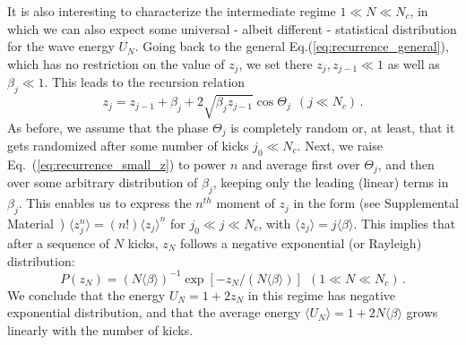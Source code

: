 \documentclass[ prl, twocolumn, superscriptaddress, amsfonts, amsmath,floatfix]{revtex4-1}
\begin{document}
It is also interesting to characterize the intermediate regime $1 \ll N \ll N_c$, in which we can also expect some universal - albeit different - statistical distribution for the wave energy $U_N$. Going back to the general Eq.(\ref{eq:recurrence_general}), which has no restriction on the value of $z_j$, we set there $z_j, z_{j-1} \ll 1$ as well as $\beta_j \ll 1$. This leads to the recursion relation
\begin{equation}
z_j = z_{j-1} + \beta_j + 2 \sqrt{\beta_j z_{j-1}} \cos \Theta_j \ \ (j \ll N_c) \, .
\label{eq:recurrence_small_z}
\end{equation}
As before, we assume that the phase $\Theta_j$ is completely random or, at least, that it gets randomized after some number of kicks $j_0 \ll N_c$. Next, we raise Eq.~(\ref{eq:recurrence_small_z}) to power $n$ and average first over $\Theta_j$, and then over some arbitrary distribution of $\beta_j$, keeping only the leading (linear) terms in $\beta_j$. {This enables us to express the $n^{th}$ moment of $z_j$ in the form (see Supplemental Material~\cite{SM})}
$\langle z_j^n \rangle = (n!) \langle z_j \rangle^n$ for $j_0 \ll j \ll N_c$,
with $\langle z_j \rangle = j \langle \beta \rangle$. This implies that after a sequence of $N$ kicks, $z_N$ follows a negative exponential (or Rayleigh) distribution:
\begin{equation}
P(z_N) = (N \langle \beta \rangle)^{-1} \exp[-z_N/(N \langle \beta \rangle)] \ \ (1 \ll N \ll N_c) \, .
\label{eq:negative_exp}
\end{equation}
We conclude that the energy $U_N=1+2z_N$ in this regime has negative exponential distribution, and that the average energy $\langle U_N \rangle = 1+2 N \langle \beta \rangle$ grows linearly with the number of kicks.
\end{document}
